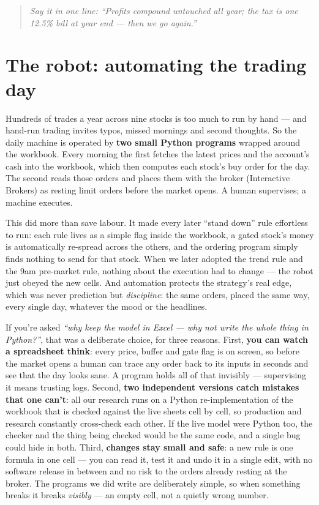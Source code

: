 \documentclass[11pt,a4paper]{article}
\newcommand{\oneline}[1]{\begin{quote}\itshape\color{bcteal}Say it in one line:
``#1''\end{quote}}
\begin{document}
\oneline{Profits compound untouched all year; the tax is one 12.5\% bill at
year end --- then we go again.}

\section{The robot: automating the trading day}

Hundreds of trades a year across nine stocks is too much to run by hand ---
and hand-run trading invites typos, missed mornings and second thoughts. So
the daily machine is operated by \textbf{two small Python programs} wrapped
around the workbook. Every morning the first fetches the latest prices and
the account's cash into the workbook, which then computes each stock's buy
order for the day. The second reads those orders and places them with the
broker (Interactive Brokers) as resting limit orders before the market
opens. A human supervises; a machine executes.

This did more than save labour. It made every later ``stand down'' rule
effortless to run: each rule lives as a simple flag inside the workbook, a
gated stock's money is automatically re-spread across the others, and the
ordering program simply finds nothing to send for that stock. When we later
adopted the trend rule and the 9am pre-market rule, nothing about the
execution had to change --- the robot just obeyed the new cells. And
automation protects the strategy's real edge, which was never prediction
but \emph{discipline}: the same orders, placed the same way, every single
day, whatever the mood or the headlines.

If you're asked \emph{``why keep the model in Excel --- why not write the
whole thing in Python?''}, that was a deliberate choice, for three reasons.
First, \textbf{you can watch a spreadsheet think}: every price, buffer and
gate flag is on screen, so before the market opens a human can trace any
order back to its inputs in seconds and see that the day looks sane. A
program holds all of that invisibly --- supervising it means trusting logs.
Second, \textbf{two independent versions catch mistakes that one can't}:
all our research runs on a Python re-implementation of the workbook that is
checked against the live sheets cell by cell, so production and research
constantly cross-check each other. If the live model were Python too, the
checker and the thing being checked would be the same code, and a single
bug could hide in both. Third, \textbf{changes stay small and safe}: a new
rule is one formula in one cell --- you can read it, test it and undo it in
a single edit, with no software release in between and no risk to the
orders already resting at the broker. The programs we did write are
deliberately simple, so when something breaks it breaks \emph{visibly} ---
an empty cell, not a quietly wrong number.
\end{document}
